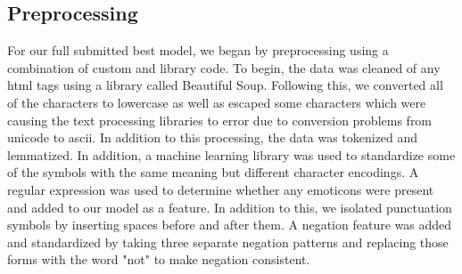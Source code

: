 \documentclass{amsart}
\theoremstyle{definition}
\theoremstyle{remark}
\numberwithin{equation}{section}
\begin{document}
\subsection{Preprocessing}
For our full submitted best model, we began by preprocessing using a combination of custom and library code.  To begin, the data was cleaned of any html tags using a library called Beautiful Soup.  Following this, we converted all of the characters to lowercase as well as escaped some characters which were causing the text processing libraries to error due to conversion problems from unicode to ascii.  In addition to this processing, the data was tokenized and lemmatized.  In addition, a machine learning library was used to standardize some of the symbols with the same meaning but different character encodings.  A regular expression was used to determine whether any emoticons were present and added to our model as a feature.  In addition to this, we isolated punctuation symbols by inserting spaces before and after them.  A negation feature was added and standardized by taking three separate negation patterns and replacing those forms with the word "not" to make negation consistent.   
\end{document}
